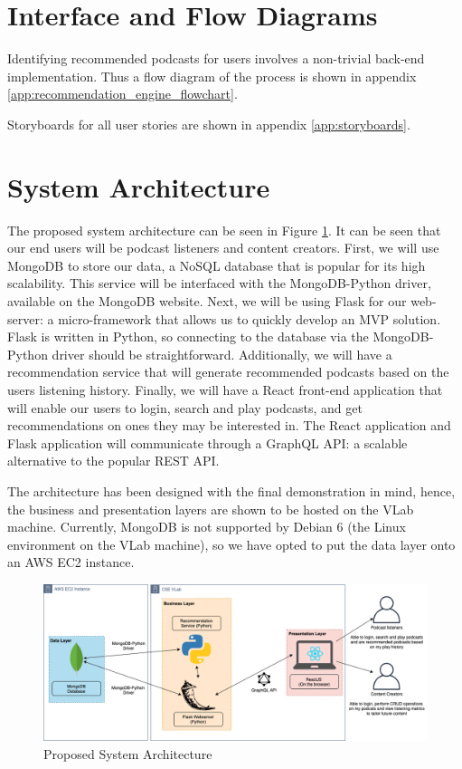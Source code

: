 \documentclass[12pt]{article}
\begin{document}
\newpage
\section{Interface and Flow Diagrams}

Identifying recommended podcasts for users involves a non-trivial back-end implementation. Thus a flow diagram of the process is shown in appendix \ref{app:recommendation_engine_flowchart}.

Storyboards for all user stories are shown in appendix \ref{app:storyboards}.


\section{System Architecture}

The proposed system architecture can be seen in Figure \ref{fig:SysArch}.
It can be seen that our end users will be podcast listeners and content creators.
First, we will use MongoDB\cite{MongoDB2020} to store our data, a NoSQL database that is popular for its high scalability.
This service will be interfaced with the MongoDB-Python driver, available on the MongoDB website\cite{MongoDB2020}.
Next, we will be using Flask\cite{flask} for our web-server: a micro-framework that allows us to quickly develop an MVP solution.
Flask is written in Python, so connecting to the database via the MongoDB-Python driver should be straightforward.
Additionally, we will have a recommendation service that will generate recommended podcasts based on the users listening history.
Finally, we will have a React\cite{react} front-end application that will enable our users to login, search and play podcasts, and get recommendations on ones they may be interested in.
The React application and Flask application will communicate through a GraphQL API: a scalable alternative to the popular REST API\cite{graphql}.

The architecture has been designed with the final demonstration in mind, hence, the business and presentation layers are shown to be hosted on the VLab machine.
Currently, MongoDB is not supported by Debian 6 (the Linux environment on the VLab machine), so we have opted to put the data layer onto an AWS EC2 instance\cite{aws_ec2}.

\begin{figure}
    \centering
    \includegraphics[width=\textwidth]{resources/SystemArchitecture}
    \caption{Proposed System Architecture}
    \label{fig:SysArch}
\end{figure}
\end{document}
